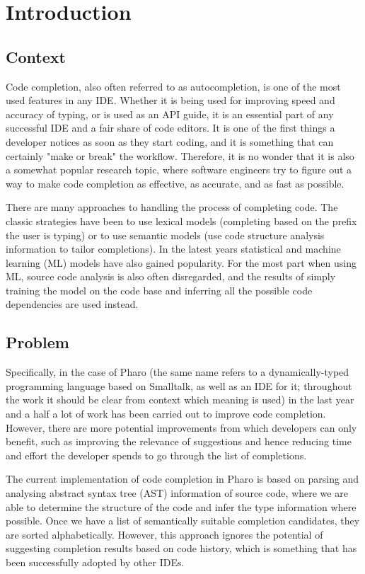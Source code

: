 \chapter{Introduction}
\label{chap:Introduction}

\section{Context}
Code completion, also often referred to as autocompletion, is one of the most used features in any IDE. Whether it is being used for improving speed and accuracy of typing, or is used as an API guide, it is an essential part of any successful IDE and a fair share of code editors. It is one of the first things a developer notices as soon as they start coding, and it is something that can certainly "make or break" the workflow. Therefore, it is no wonder that it is also a somewhat popular research topic, where software engineers try to figure out a way to make code completion as effective, as accurate, and as fast as possible.

There are many approaches to handling the process of completing code. The classic strategies have been to use lexical models (completing based on the prefix the user is typing) or to use semantic models (use code structure analysis information to tailor completions). In the latest years statistical and machine learning (ML) models have also gained popularity. For the most part when using ML, source code analysis is also often disregarded, and the results of simply training the model on the code base and inferring all the possible code dependencies are used instead.

\section{Problem}
\label{sec:Introduction-Problem}
Specifically, in the case of Pharo (the same name refers to a dynamically-typed programming language based on Smalltalk, as well as an IDE for it; throughout the work it should be clear from context which meaning is used) in the last year and a half a lot of work has been carried out to improve code completion. However, there are more potential improvements from which developers can only benefit, such as improving the relevance of suggestions and hence reducing time and effort the developer spends to go through the list of completions.

The current implementation of code completion in Pharo is based on parsing and analysing abstract syntax tree (AST) information of source code, where we are able to determine the structure of the code and infer the type information where possible. Once we have a list of semantically suitable completion candidates, they are sorted alphabetically. However, this approach ignores the potential of suggesting completion results based on code history, which is something that has been successfully adopted by other IDEs.

